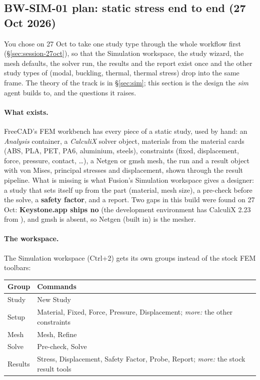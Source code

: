 \subsection{BW-SIM-01 plan: static stress end to end (27 Oct 2026)}\label{sec:sim01-plan}

You chose on 27 Oct to take one study type through the whole workflow first (\S\ref{sec:session-27oct}), so
that the Simulation workspace, the study wizard, the mesh defaults, the solver run, the results and the report
exist once and the other study types of  (modal, buckling, thermal, thermal stress) drop into the
same frame. The theory of the track is in \S\ref{sec:sim}; this section is the design the \emph{sim} agent
builds to, and the questions it raises.

\paragraph{What exists.} FreeCAD's FEM workbench has every piece of a static study, used by hand: an
\emph{Analysis} container, a \emph{CalculiX} solver object, materials from the material cards (ABS, PLA, PET,
PA6, aluminium, steels), constraints (fixed, displacement, force, pressure, contact, \dots), a Netgen or gmsh
mesh, the  run and a result object with von Mises, principal stresses and displacement, shown through
the result pipeline. What is missing is what Fusion's Simulation workspace gives a designer: a study that sets
itself up from the part (material, mesh size), a pre-check before the solve, a \textbf{safety factor}, and a
report. Two gaps in this build were found on 27 Oct: \textbf{Keystone.app ships no } (the development
environment has CalculiX 2.23 from ), and gmsh is absent, so Netgen (built in) is the mesher.

\paragraph{The workspace.} The Simulation workspace (Ctrl+2) gets its own groups instead of the stock FEM
toolbars:
\begin{center}
\small
\begin{tabular}{@{}ll@{}}
\toprule
Group & Commands\\
\midrule
Study & New Study\\
Setup & Material, Fixed, Force, Pressure, Displacement; \emph{more:} the other constraints\\
Mesh & Mesh, Refine\\
Solve & Pre-check, Solve\\
Results & Stress, Displacement, Safety Factor, Probe, Report; \emph{more:} the stock result tools\\
\bottomrule
\end{tabular}
\end{center}

